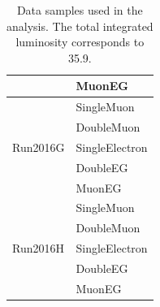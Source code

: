 \begin{table}
\begin{center}
\begin{tabular}{|l|l|}
                                & MuonEG \\ \hline
\multirow{5}{*}{Run2016G}       & SingleMuon  \\
                                & DoubleMuon \\
                                & SingleElectron \\
                                & DoubleEG \\
                                & MuonEG \\ \hline
\multirow{5}{*}{Run2016H}       & SingleMuon  \\
                                & DoubleMuon \\
                                & SingleElectron \\
                                & DoubleEG \\
                                & MuonEG \\ \hline
\hline 
\end{tabular}
\caption{Data samples used in the analysis. The total integrated luminosity corresponds to 35.9\fbinv.
\label{tab:data}}
\end{center}
\end{table}

